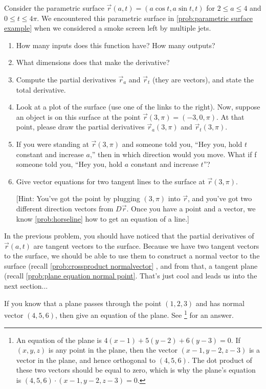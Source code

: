 \begin{problem}
 Consider the parametric surface $\vec r(a,t) = (a\cos t, a\sin t, t)$ for $2\leq a\leq 4$ and $0\leq t\leq 4\pi$. We encountered this parametric surface in \ref{prob:parametric surface example} when we considered a smoke screen left by multiple jets.
\begin{enumerate}
	\item How many inputs does this function have? How many outputs?
	\item What dimensions does that make the derivative?
	\item Compute the partial derivatives $\vec r_a$ and $\vec r_t$ (they are vectors), and state the total derivative.
	\item Look at a plot of the surface (use one of the links to the right). Now, suppose an object is on this surface at the point $\vec r(3,\pi) = (-3,0,\pi)$. At that point, please draw the partial derivatives $\vec r_a(3,\pi)$ and $\vec r_t(3,\pi)$.
 \item If you were standing at $\vec r(3,\pi)$ and someone told you, ``Hey you, hold $t$ constant and increase $a$,'' then in which direction would you move. What if f someone told you, ``Hey you, hold $a$ constant and increase $t$''?
 \item Give vector equations for two tangent lines to the surface at $\vec r(3,\pi)$. 

[Hint: You've got the point by plugging $(3,\pi)$ into $\vec r$, and you've got two different direction vectors from $D\vec r$. Once you have a point and a vector, we know \ref{prob:horseline} how to get an equation of a line.]
\end{enumerate}
  
\end{problem}

In the previous problem, you should have noticed that the partial derivatives of $\vec r(a,t)$ are tangent vectors to the surface. Because we have two tangent vectors to the surface, we should be able to use them to construct a normal vector to the surface (recall \ref{prob:crossproduct normalvector} , and from that, a tangent plane (recall \ref{prob:plane equation normal point}. That's just cool and leads us into the next section...
\begin{review*}
 If you know that a plane passes through the point $(1,2,3)$ and has normal vector $(4,5,6)$, then give an equation of the plane.  See \footnote{An equation of the plane is $4(x-1)+5(y-2)+6(y-3)=0$. If $(x,y,z)$ is any point in the plane, then the vector $(x-1,y-2,z-3)$ is a vector in the plane, and hence orthogonal to $(4,5,6)$. The dot product of these two vectors should be equal to zero, which is why the plane's equation is $(4,5,6)\cdot (x-1,y-2,z-3)=0$.} for an answer.
\end{review*}

